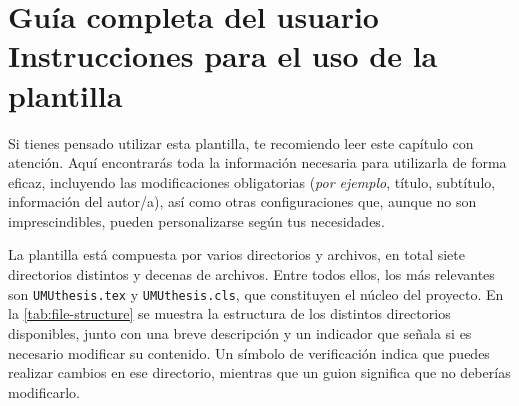 \chapter[Guía completa del usuario: Instrucciones para el uso de la plantilla]{Guía completa del usuario Instrucciones para el uso de la plantilla}
\label{cp:user-guide}

\parindent0pt

Si tienes pensado utilizar esta plantilla, te recomiendo leer este capítulo con atención. Aquí encontrarás toda la información necesaria para utilizarla de forma eficaz, incluyendo las modificaciones obligatorias (\textit{por ejemplo}, título, subtítulo, información del autor/a), así como otras configuraciones que, aunque no son imprescindibles, pueden personalizarse según tus necesidades.

La plantilla está compuesta por varios directorios y archivos, en total siete directorios distintos y decenas de archivos. Entre todos ellos, los más relevantes son \texttt{UMUthesis.tex} y \texttt{UMUthesis.cls}, que constituyen el núcleo del proyecto. En la \autoref{tab:file-structure} se muestra la estructura de los distintos directorios disponibles, junto con una breve descripción y un indicador que señala si es necesario modificar su contenido. Un símbolo de verificación indica que puedes realizar cambios en ese directorio, mientras que un guion significa que no deberías modificarlo.

